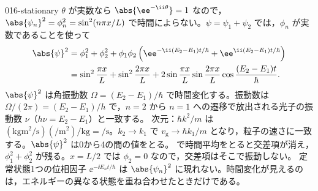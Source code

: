 \documentclass[uplatex,dvipdfmx,a4paper,11pt]{jsarticle}
\begin{document}
\begin{kaisetsu}{016-stationary}
 $\theta$ が実数なら $\abs{\ee^{-\ii\theta}}=1$ なので，$\abs{\psi_{n}}^{2}=\phi_{n}^{2}=\sin^{2}(n\pi x/L)$ で時間によらない。$\psi=\psi_{1}+\psi_{2}$ では，$\phi_{n}$ が実数であることを使って
\begin{align*}
  \abs{\psi}^{2}&=\phi_{1}^{2}+\phi_{2}^{2}+\phi_{1}\phi_{2}\left(\ee^{-\ii(E_{2}-E_{1})t/\hbar}+\ee^{\ii(E_{2}-E_{1})t/\hbar}\right)\\
  &=\sin^{2}\frac{\pi x}{L}+\sin^{2}\frac{2\pi x}{L}+2\sin\frac{\pi x}{L}\sin\frac{2\pi x}{L}\cos\frac{(E_{2}-E_{1})t}{\hbar}.
\end{align*}
$\abs{\psi}^{2}$ は角振動数 $\Omega=(E_{2}-E_{1})/\hbar$ で時間変化する。振動数は $\Omega/(2\pi)=(E_{2}-E_{1})/h$ で，$n=2$ から $n=1$ への遷移で放出される光子の振動数 $\nu$（$h\nu=E_{2}-E_{1}$）と一致する。
\kenzan 次元：$\hbar k^{2}/m$ は $(\unit{\kilogram\metre\squared\per\second})(\unit{\per\metre\squared})/\unit{\kilogram}=\unit{\per\second}$。$k_{2}\to k_{1}$ で $v_{\mathrm{g}}\to\hbar k_{1}/m$ となり，粒子の速さに一致する。$\abs{\psi}^{2}$ は0から4の間の値をとる。 で時間平均をとると交差項が消え，$\phi_{1}^{2}+\phi_{2}^{2}$ が残る。$x=L/2$ では $\phi_{2}=0$ なので，交差項はそこで振動しない。
\tsumazuki 定常状態1つの位相因子 $\ee^{-\ii E_{n}t/\hbar}$ は $\abs{\psi_{n}}^{2}$ に現れない。時間変化が見えるのは，エネルギーの異なる状態を重ね合わせたときだけである。
\end{kaisetsu}
\end{document}

